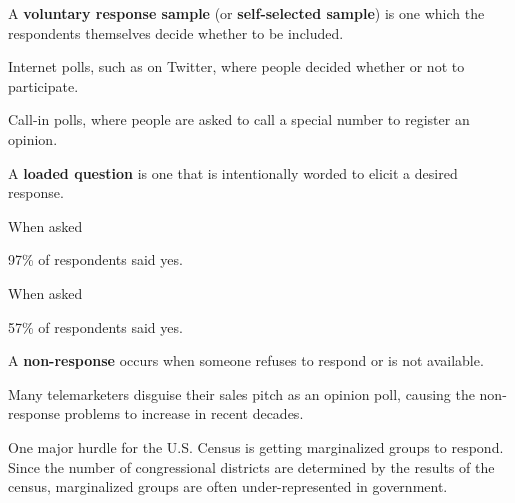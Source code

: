 \documentclass{beamer}
\begin{document}
\begin{frame}
\begin{definition}
A \textbf{voluntary response sample} (or \textbf{self-selected sample}) is one which the respondents themselves decide whether to be included.\end{definition}\pause

\begin{example}
Internet polls, such as on Twitter, where people decided whether or not to participate.
\end{example}\pause

\begin{example}
Call-in polls, where people are asked to call a special number to register an opinion.
\end{example}
\end{frame}

\begin{frame}
\begin{definition}
A \textbf{loaded question} is one that is intentionally worded to elicit a desired response.
\end{definition}\pause

\begin{example}
When asked \blockquote{} 97\% of respondents said yes.
\end{example}\pause

\begin{example}
When asked \blockquote{} 57\% of respondents said yes.
\end{example}
\end{frame}

\begin{frame}
\begin{definition}
A \textbf{non-response} occurs when someone refuses to respond or is not available.
\end{definition}\pause

\begin{example}
Many telemarketers disguise their sales pitch as an opinion poll, causing the non-response problems to increase in recent decades.
\end{example}\pause

\begin{example}
One major hurdle for the U.S. Census is getting marginalized groups to respond. Since the number of congressional districts are determined by the results of the census, marginalized groups are often under-represented in government.
\end{example}
\end{frame}
\end{document}

